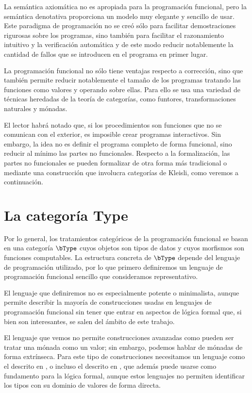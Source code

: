 La semántica axiomática no es apropiada para la programación funcional, pero la
semántica denotativa proporciona un modelo muy elegante y sencillo de usar.
Este paradigma de programación no se creó sólo para facilitar demostraciones
rigurosas sobre los programas, sino también para facilitar el razonamiento
intuitivo y la verificación automática y de este modo reducir notablemente la
cantidad de fallos que se introducen en el programa en primer lugar.

La programación funcional no sólo tiene ventajas respecto a corrección, sino que
también permite reducir notablemente el tamaño de los programas tratando las
funciones como valores y operando sobre ellas. Para ello se usa una variedad de
técnicas heredadas de la teoría de categorías, como funtores, transformaciones
naturales y mónadas.

El lector habrá notado que, si los procedimientos son funciones que no se
comunican con el exterior, es imposible crear programas interactivos. Sin
embargo, la idea no es definir el programa completo de forma funcional, sino
reducir al mínimo las partes no funcionales. Respecto a la formalización, las
partes no funcionales se pueden formalizar de otra forma más tradicional o
mediante una construcción que involucra categorías de Kleisli, como veremos a
continuación.

\section{La categoría Type} %

Por lo general, los tratamientos categóricos de la programación funcional se
basan en una categoría $\bType$ cuyos objetos son tipos de datos y cuyos
morfismos son funciones computables. La estructura concreta de $\bType$ depende
del lenguaje de programación utilizado, por lo que primero definiremos un
lenguaje de programación funcional sencillo que consideramos representativo.

El lenguaje que definiremos no es especialmente potente o minimalista, aunque
permite describir la mayoría de construcciones usadas en lenguajes de
programación funcional sin tener que entrar en aspectos de lógica formal que, si
bien son interesantes, se salen del ámbito de este trabajo.

El lenguaje que vemos no permite construcciones avanzadas como pueden ser tratar
una mónada como un valor; sin embargo, podemos hablar de mónadas de forma
extrínseca. Para este tipo de construcciones necesitamos un lenguaje como el
descrito en \cite{hindley-milner}, o incluso el descrito en \cite{coc}, que
además puede usarse como fundamento para la lógica formal, aunque estos
lenguajes no permiten identificar los tipos con su dominio de valores de forma
directa.\cite{polynoset}

